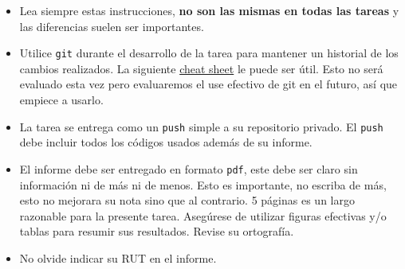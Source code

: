 \documentclass[letter, 11pt]{article}
\begin{document}
\vspace{1em}
\begin{itemize}
  
  \item Lea siempre estas instrucciones, {\bf no son las mismas en todas las
    tareas} y las diferencias suelen ser importantes.

  \item Utilice \texttt{git} durante el desarrollo de la tarea para mantener un
    historial de los cambios realizados. La siguiente
    \href{https://education.github.com/git-cheat-sheet-education.pdf}{cheat
    sheet} le puede ser útil. Esto no será evaluado esta vez pero evaluaremos
    el use efectivo de git en el futuro, así que empiece a usarlo.

  \item La tarea se entrega como un \texttt{push} simple a su repositorio
    privado. El \texttt{push} debe incluir todos los códigos usados además de
    su informe.

  \item El informe debe ser entregado en formato \texttt{pdf}, este debe ser
    claro sin información ni de más ni de menos. Esto es importante, no escriba
    de más, esto no mejorara su nota sino que al contrario. 5 páginas es un
    largo razonable para la presente tarea.  Asegúrese de utilizar figuras
    efectivas y/o tablas para resumir sus resultados. Revise su ortografía.

  \item No olvide indicar su RUT en el informe.

\end{itemize}

\end{document}
